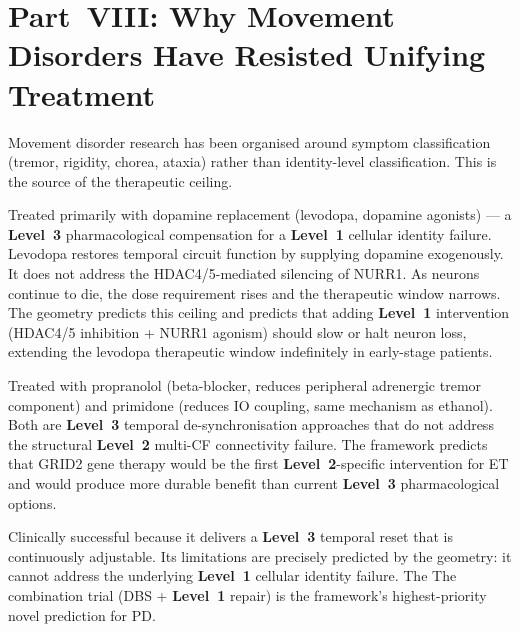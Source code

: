 \documentclass[12pt,a4paper]{article}
\newcommand{\Lev}[1]{\textbf{Level~#1}}
\begin{document}
\section{Part~VIII: Why Movement Disorders Have Resisted
Unifying Treatment}

Movement disorder research has been organised around symptom
classification (tremor, rigidity, chorea, ataxia) rather than identity-level
classification. This is the source of the therapeutic ceiling.

\begin{description}[leftmargin=2em, itemsep=0.5em]
  \item[\textbf{Parkinson's disease:}] Treated primarily with dopamine
    replacement (levodopa, dopamine agonists) --- a \Lev{3} pharmacological
    compensation for a \Lev{1} cellular identity failure. Levodopa restores
    temporal circuit function by supplying dopamine exogenously. It does not
    address the HDAC4/5-mediated silencing of NURR1. As neurons continue to
    die, the dose requirement rises and the therapeutic window narrows.
    The geometry predicts this ceiling and predicts that adding \Lev{1}
    intervention (HDAC4/5 inhibition + NURR1 agonism) should slow or halt
    neuron loss, extending the levodopa therapeutic window indefinitely in
    early-stage patients.

  \item[\textbf{Essential tremor:}] Treated with propranolol (beta-blocker,
    reduces peripheral adrenergic tremor component) and primidone (reduces
    IO coupling, same mechanism as ethanol). Both are \Lev{3} temporal
    de-synchronisation approaches that do not address the structural \Lev{2}
    multi-CF connectivity failure. The framework predicts that GRID2 gene
    therapy would be the first \Lev{2}-specific intervention for ET and
    would produce more durable benefit than current \Lev{3} pharmacological
    options.

  \item[\textbf{DBS:}] Clinically successful because it delivers a \Lev{3}
    temporal reset that is continuously adjustable. Its limitations are
    precisely predicted by the geometry: it cannot address the underlying
    \Lev{1} cellular identity failure. The     The combination trial (DBS + \Lev{1}
    repair) is the framework's highest-priority novel prediction for PD.
\end{description}
\end{document}
